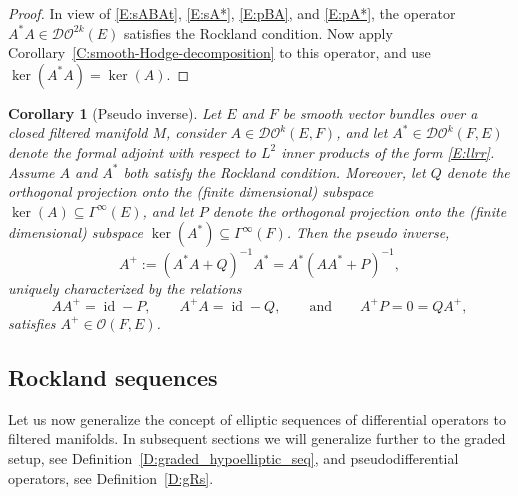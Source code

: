 \documentclass[reqno,12pt]{amsart}
\DeclareMathOperator{\id}{id}
\newcommand{\DO}{\mathcal D\mathcal O}
\theoremstyle{plain}
\newtheorem{corollary}[theorem]{Corollary}
\theoremstyle{definition}
\begin{document}
\begin{proof}
In view of \eqref{E:sABAt}, \eqref{E:sA*}, \eqref{E:pBA}, and \eqref{E:pA*}, the operator $A^*A\in\DO^{2k}(E)$ satisfies the Rockland condition.
Now apply Corollary~\ref{C:smooth-Hodge-decomposition} to this operator, and use $\ker(A^*A)=\ker(A)$.
\end{proof}


\begin{corollary}[Pseudo inverse]\label{C:smooth-pseudoinverse}
Let $E$ and $F$ be smooth vector bundles over a closed filtered manifold $M$, consider $A\in\DO^k(E,F)$, and let $A^*\in\DO^k(F,E)$ denote the formal adjoint with respect to $L^2$ inner products of the form \eqref{E:llrr}.
Assume $A$ and $A^*$ both satisfy the Rockland condition.
Moreover, let $Q$ denote the orthogonal projection onto the (finite dimensional) subspace $\ker(A)\subseteq\Gamma^\infty(E)$, and let $P$ denote the orthogonal projection onto the (finite dimensional) subspace $\ker(A^*)\subseteq\Gamma^\infty(F)$.
Then the pseudo inverse, 
$$
A^+:=(A^*A+Q)^{-1}A^*=A^*(AA^*+P)^{-1},
$$ 
uniquely characterized by the relations 
$$
AA^+=\id-P,\qquad A^+A=\id-Q,\qquad\text{and}\qquad A^+P=0=QA^+,
$$ 
satisfies $A^+\in\mathcal O(F,E)$.
\end{corollary}





\subsection{Rockland sequences}\label{SS:hesDO}





Let us now generalize the concept of elliptic sequences of differential operators to filtered manifolds.
In subsequent sections we will generalize further to the graded setup, see Definition~\ref{D:graded_hypoelliptic_seq}, and pseudodifferential operators, see Definition~\ref{D:gRs}.
\end{document}
